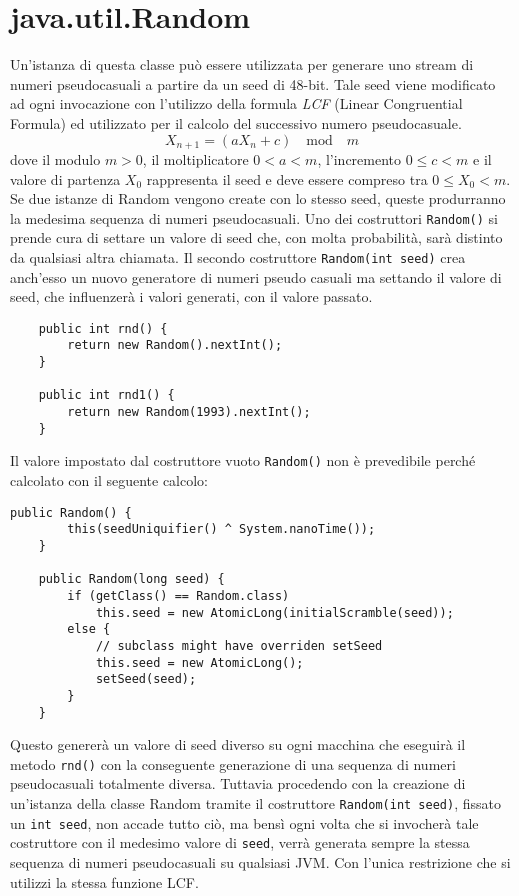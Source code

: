 	\section{java.util.Random}
	\label{java.util.random}
		Un'istanza di questa classe può essere utilizzata per generare uno stream di numeri pseudocasuali a partire da un seed di 48-bit. Tale seed viene modificato ad ogni invocazione con l'utilizzo della formula \textit{LCF} (Linear Congruential Formula) ed utilizzato per il calcolo del successivo numero pseudocasuale. 
		\[ X_{n+1} = (aX_n + c) \quad \text{mod} \quad m\]
		dove il modulo $m > 0$, il moltiplicatore $0 < a < m$, l'incremento $0 \leq c < m$ e il valore di partenza $X_0$ rappresenta il seed e deve essere compreso tra $0 \leq X_0 < m$.
		Se due istanze di Random vengono create con lo stesso seed, queste produrranno la medesima sequenza di numeri pseudocasuali. Uno dei costruttori \lstinline|Random()| si prende cura di settare un valore di seed che, con molta probabilità, sarà distinto da qualsiasi altra chiamata. Il secondo costruttore \lstinline|Random(int seed)| crea anch'esso un nuovo generatore di numeri pseudo casuali ma settando il valore di seed, che influenzerà i valori generati, con il valore passato. 
		\begin{lstlisting}
	public int rnd() {
		return new Random().nextInt(); 
	}
	
	public int rnd1() {
		return new Random(1993).nextInt(); 
	}  
		\end{lstlisting}
		Il valore impostato dal costruttore vuoto \lstinline|Random()| non è prevedibile perché calcolato con il seguente calcolo:
		\begin{lstlisting}[numbers=none,frame=none]
	public Random() {
		this(seedUniquifier() ^ System.nanoTime());
	}
	
	public Random(long seed) {
		if (getClass() == Random.class)
			this.seed = new AtomicLong(initialScramble(seed));
		else {
			// subclass might have overriden setSeed
			this.seed = new AtomicLong();
			setSeed(seed);
		}
	}
		\end{lstlisting}
		Questo genererà un valore di seed diverso su ogni macchina che eseguirà il metodo \lstinline|rnd()| con la conseguente generazione di una sequenza di numeri pseudocasuali totalmente diversa. Tuttavia procedendo con la creazione di un'istanza della classe Random tramite il costruttore \lstinline|Random(int seed)|, fissato un \lstinline|int seed|, non accade tutto ciò, ma bensì ogni volta che si invocherà tale costruttore con il medesimo valore di \lstinline|seed|, verrà generata sempre la stessa sequenza di numeri pseudocasuali su qualsiasi JVM. Con l'unica restrizione che si utilizzi la stessa funzione LCF. 
